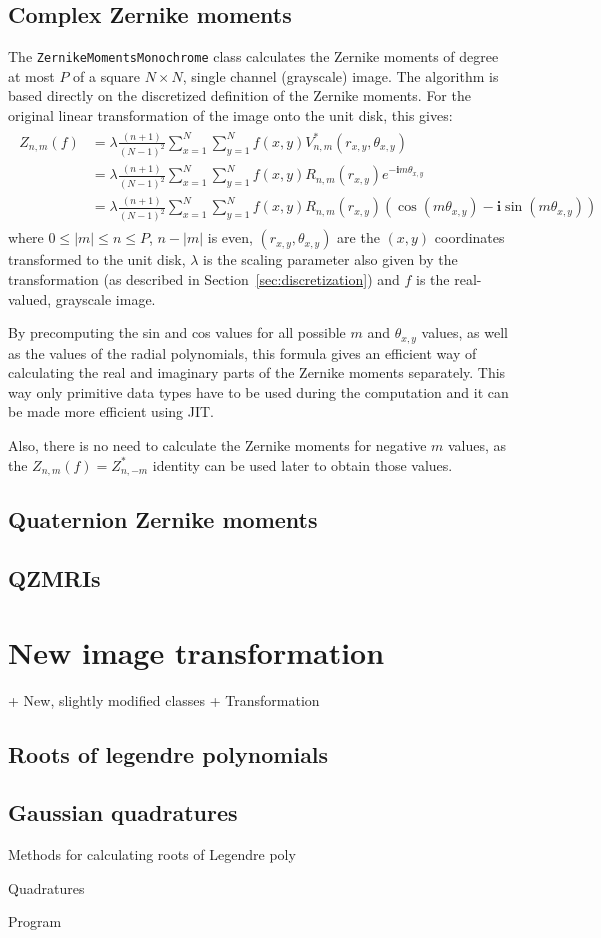 \subsection{Complex Zernike moments}
The \texttt{ZernikeMomentsMonochrome} class calculates the Zernike moments of degree at most $P$ of a square $N \times N$, single channel (grayscale) image. The algorithm is based directly on the discretized definition of the Zernike moments.
For the original linear transformation of the image onto the unit disk, this gives:
\begin{gather*}
    \begin{split}
    Z_{n,m}(f) &= \lambda\frac{(n+1)}{(N-1)^2}\sum_{x=1}^{N}\sum_{y=1}^{N}f(x,y)V_{n,m}^{*}(r_{x,y},\theta_{x,y}) \\
    &= \lambda\frac{(n+1)}{(N-1)^2}\sum_{x=1}^{N}\sum_{y=1}^{N}f(x,y)R_{n,m}(r_{x,y})e^{-\bm{i}m\theta_{x,y}} \\
    &= \lambda\frac{(n+1)}{(N-1)^2}\sum_{x=1}^{N}\sum_{y=1}^{N}f(x,y)R_{n,m}(r_{x,y})(\cos (m\theta_{x,y}) - \bm{i}\sin (m\theta_{x,y}))
    \end{split}
\end{gather*}
where $0\leq |m| \leq n \leq P$, $n - |m|$ is even, $(r_{x,y},\theta_{x,y})$ are the $(x,y)$ coordinates transformed to the unit disk, $\lambda$ is the scaling parameter also given by the transformation (as described in Section~\ref{sec:discretization}) and $f$ is the real-valued, grayscale image.

By precomputing the sin and cos values for all possible $m$ and $\theta_{x,y}$ values, as well as the values of the radial polynomials, this formula gives an efficient way of calculating the real and imaginary parts of the Zernike moments separately. This way only primitive data types have to be used during the computation and it can be made more efficient using JIT.

Also, there is no need to calculate the Zernike moments for negative $m$ values, as the $Z_{n,m}(f) = Z_{n,-m}^{*}$ identity can be used later to obtain those values.

\subsection{Quaternion Zernike moments}
\subsection{QZMRIs}

\section{New image transformation}
+ New, slightly modified classes
+ Transformation

\subsection{Roots of legendre polynomials}

\subsection{Gaussian quadratures}



Methods for calculating roots of Legendre poly

Quadratures

Program